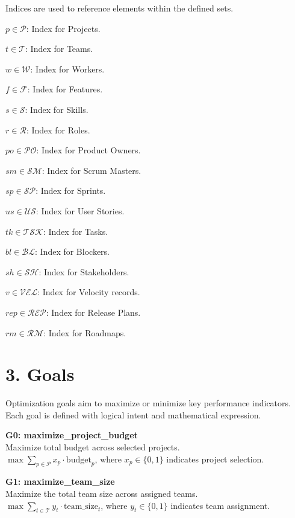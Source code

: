\documentclass[12pt]{article}
\begin{document}
Indices are used to reference elements within the defined sets.

\item $ p \in \mathcal{P} $: Index for Projects.
    \item $ t \in \mathcal{T} $: Index for Teams.
    \item $ w \in \mathcal{W} $: Index for Workers.
    \item $ f \in \mathcal{F} $: Index for Features.
    \item $ s \in \mathcal{S} $: Index for Skills.
    \item $ r \in \mathcal{R} $: Index for Roles.
    \item $ po \in \mathcal{PO} $: Index for Product Owners.
    \item $ sm \in \mathcal{SM} $: Index for Scrum Masters.
    \item $ sp \in \mathcal{SP} $: Index for Sprints.
    \item $ us \in \mathcal{US} $: Index for User Stories.
    \item $ tk \in \mathcal{TSK} $: Index for Tasks.
    \item $ bl \in \mathcal{BL} $: Index for Blockers.
    \item $ sh \in \mathcal{SH} $: Index for Stakeholders.
    \item $ v \in \mathcal{VEL} $: Index for Velocity records.
    \item $ rep \in \mathcal{REP} $: Index for Release Plans.
    \item $ rm \in \mathcal{RM} $: Index for Roadmaps.

\section{3. Goals}

Optimization goals aim to maximize or minimize key performance indicators. Each goal is defined with logical intent and mathematical expression.

\item \textbf{G0: maximize\_project\_budget} \\
    Maximize total budget across selected projects. \\
    $ \max \sum_{p \in \mathcal{P}} x_p \cdot \text{budget}_p $, where $ x_p \in \{0,1\} $ indicates project selection.

    \item \textbf{G1: maximize\_team\_size} \\
    Maximize the total team size across assigned teams. \\
    $ \max \sum_{t \in \mathcal{T}} y_t \cdot \text{team\_size}_t $, where $ y_t \in \{0,1\} $ indicates team assignment.
\end{document}
